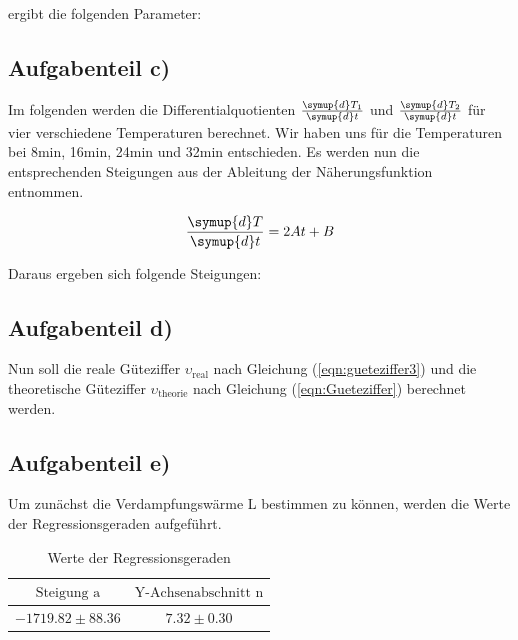         ergibt die folgenden Parameter:

        


        \subsection{Aufgabenteil c)}

        Im folgenden werden die Differentialquotienten $\frac{\symup{d} T_1}{\symup{d} t}$ und $\frac{\symup{d} T_2}{\symup{d} t}$ für vier verschiedene Temperaturen berechnet.
        Wir haben uns für die Temperaturen bei 8min, 16min, 24min und 32min entschieden.
        Es werden nun die entsprechenden Steigungen aus der Ableitung der Näherungsfunktion entnommen.

        \begin{equation}
        \frac{\symup{d}T}{\symup{d}t} = 2At + B
        \end{equation}

        Daraus ergeben sich folgende Steigungen:
        
        


        \newpage
        \subsection{Aufgabenteil d)}

        Nun soll die reale Güteziffer $\upsilon_\text{real}$ nach Gleichung (\ref{eqn:gueteziffer3}) und die theoretische Güteziffer $\upsilon_\text{theorie}$ nach Gleichung (\ref{eqn:Gueteziffer}) berechnet werden.

        



        \subsection{Aufgabenteil e)}

        Um zunächst die Verdampfungswärme L bestimmen zu können, werden die Werte der Regressionsgeraden aufgeführt.

        \begin{table}
        \centering
        \label{massendurchsatz}
        \begin{tabular}{c c}
        \toprule
        $\text{Steigung a}$ & $\text{Y-Achsenabschnitt n}$ \\
        \midrule
        $-1719.82 \pm 88.36$ & $7.32 \pm 0.30$ \\
        \bottomrule
        \end{tabular}
        \caption{Werte der Regressionsgeraden}
        \end{table}

